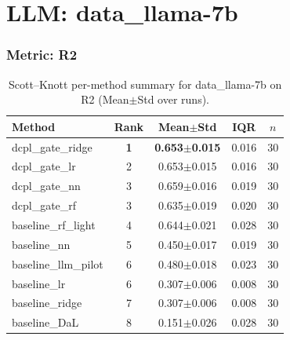 \section*{LLM: data\_llama-7b}

\subsubsection*{Metric: R2}
\begin{table}[H]
\centering
\scriptsize
\setlength{\tabcolsep}{4pt}
\renewcommand{\arraystretch}{1.1}
\caption{Scott--Knott per-method summary for data\_llama-7b on R2 (Mean$\pm$Std over runs).}
\label{tab:sk_data_llama-7b_R2}
\begin{tabular}{l|c|c|c|c}
\hline
\textbf{Method} & \textbf{Rank} & \textbf{Mean$\pm$Std} & \textbf{IQR} & \textbf{$n$} \\
\hline
\rowcolor{red!15} dcpl\_gate\_ridge & \textbf{1} & \textbf{0.653$\pm$0.015} & 0.016 & 30 \\
dcpl\_gate\_lr & 2 & 0.653$\pm$0.015 & 0.016 & 30 \\
dcpl\_gate\_nn & 3 & 0.659$\pm$0.016 & 0.019 & 30 \\
dcpl\_gate\_rf & 3 & 0.635$\pm$0.019 & 0.020 & 30 \\
baseline\_rf\_light & 4 & 0.644$\pm$0.021 & 0.028 & 30 \\
baseline\_nn & 5 & 0.450$\pm$0.017 & 0.019 & 30 \\
baseline\_llm\_pilot & 6 & 0.480$\pm$0.018 & 0.023 & 30 \\
baseline\_lr & 6 & 0.307$\pm$0.006 & 0.008 & 30 \\
baseline\_ridge & 7 & 0.307$\pm$0.006 & 0.008 & 30 \\
baseline\_DaL & 8 & 0.151$\pm$0.026 & 0.028 & 30 \\
\hline
\end{tabular}
\end{table}

